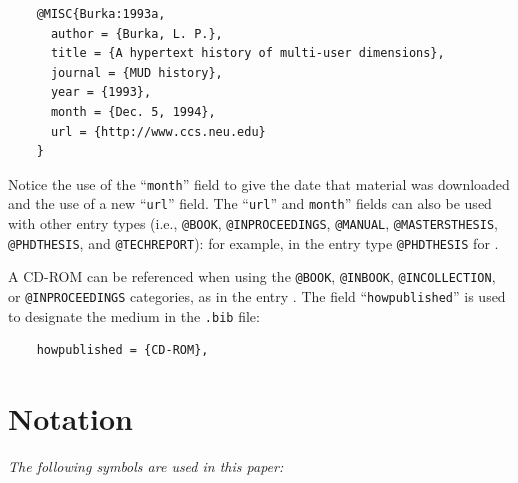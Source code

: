 \documentclass[Journal,LineNumbers]{ascelike-new}
\newenvironment{Shaded}{\begin{snugshade}}{\end{snugshade}}
\newcommand{\CharTok}[1]{\textcolor[rgb]{0.13,0.47,0.30}{#1}}
\newcommand{\ExtensionTok}[1]{\textcolor[rgb]{0.00,0.23,0.31}{#1}}
\newcommand{\FunctionTok}[1]{\textcolor[rgb]{0.28,0.35,0.67}{#1}}
\newcommand{\KeywordTok}[1]{\textcolor[rgb]{0.00,0.23,0.31}{\textbf{#1}}}
\newcommand{\NormalTok}[1]{\textcolor[rgb]{0.00,0.23,0.31}{#1}}
\newcommand{\OperatorTok}[1]{\textcolor[rgb]{0.37,0.37,0.37}{#1}}
\newcommand{\SpecialCharTok}[1]{\textcolor[rgb]{0.37,0.37,0.37}{#1}}
\newcommand{\SpecialStringTok}[1]{\textcolor[rgb]{0.13,0.47,0.30}{#1}}
\begin{document}
\begin{verbatim}
    @MISC{Burka:1993a,
      author = {Burka, L. P.},
      title = {A hypertext history of multi-user dimensions},
      journal = {MUD history},
      year = {1993},
      month = {Dec. 5, 1994},
      url = {http://www.ccs.neu.edu}
    }
\end{verbatim}

Notice the use of the ``\texttt{month}'' field to give the date that
material was downloaded and the use of a new ``\texttt{url}'' field. The
``\texttt{url}'' and \texttt{month}'' fields can also be used with other
entry types (i.e., \texttt{@BOOK}, \texttt{@INPROCEEDINGS},
\texttt{@MANUAL}, \texttt{@MASTERSTHESIS}, \texttt{@PHDTHESIS}, and
\texttt{@TECHREPORT}): for example, in the entry type
\texttt{@PHDTHESIS} for \citep{Wichtmann:2005a}.

A CD-ROM can be referenced when using the \texttt{@BOOK},
\texttt{@INBOOK}, \texttt{@INCOLLECTION}, or \texttt{@INPROCEEDINGS}
categories, as in the entry \citep{Liggett:1998a}. The field
``\texttt{howpublished}'' is used to designate the medium in the
\texttt{.bib} file:

\begin{verbatim}
    howpublished = {CD-ROM},
\end{verbatim}

\appendix

\section{Notation}\label{sec-app-notation}

\emph{The following symbols are used in this paper:}

\begin{Shaded}
\end{Shaded}
\end{document}
